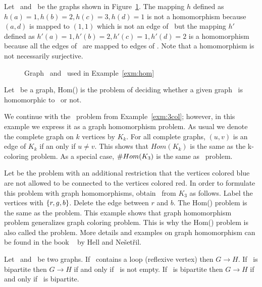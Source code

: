\begin{example}\label{exm:hom}
Let \mG\ and \mH\ be the graphs shown in Figure~\ref{fig:hom}\@. The mapping \(h\)
defined as \(h(a)=1, h(b)=2, h(c)=3, h(d)=1\)
is not a homomorphism because \((a,d)\) is mapped to \((1,1)\) which is not an 
edge of \mH\ but the mapping \(h'\) defined as \(h'(a)=1, h'(b)=2, h'(c)=1, h'(d)=2\) 
is a homomorphism because all the edges of \mG\ are mapped to edges of \mH. 
Note that a homomorphism is not necessarily surjective.

\begin{figure}[h]
\center
\caption{Graph \mG\ and \mH\ used in Example~\ref{exm:hom}} \label{fig:hom}
\end{figure}
\end{example}

\begin{defi}[Hom(\mH)]
Let \mH\ be a graph, Hom(\mH) is the problem of deciding whether a given graph \mG\
is homomorphic to \mH\ or not.
\end{defi}

\begin{example}[\tcoloring]
We continue with the \tcoloring\ problem from Example~\ref{exm:3col}; however, in this example 
we express it as a graph homomorphism problem. As usual we denote the complete graph
on \(k\) vertices by \(K_k\)\@. For all complete graphs, \((u,v)\) is an edge of \(K_k\)
if an only
if \(u\neq v\)\@. This shows that \(Hom(K_k)\) is the same as
the k-coloring problem. As a special case, \(\#Hom(K_3)\) is the same as \tcoloring\ problem.
\end{example}

Let  be the  problem with an additional
restriction that the vertices colored blue are not allowed to be connected 
to the vertices colored red. In order to formulate this problem with graph homomorphisms,
obtain \mH\ from \(K_3\) as follows. Label the vertices with \(\{{r,g,b}\}\)\@.
Delete the edge between \(r\) and \(b\). The Hom(\mH) problem is the same as
the \pname{N0RB-3-Coloring} problem.
This example shows that graph homomorphism problem generalizes graph coloring problem. This is why
the Hom(\mH) problem is also called the \pname{H-Coloring} problem.
More details and examples on graph homomorphism 
can be found in the book ~\cite{hellbook} by Hell and Ne\v{s}et\v{r}il.

\begin{obs}\label{obs:hom}
Let \mG\ and \mH\ be two graphs.
If \mH\ contains a loop (reflexive vertex) then \(G \to H\)\@.
If \mG\ is bipartite then \(G \to H\) if and only if \mH\ is not empty.
If \mH\ is bipartite then \(G \to H\) if and only if \mG\ is bipartite.
\end{obs}

